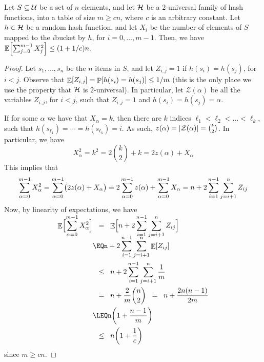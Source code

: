 \begin{lemma}
    Let $S \subseteq \mathcal{U}$ be a set of $n$ elements, and let $\mathcal{H}$ be a
    $2$-universal family of hash functions, into a table of size
    $m \geq cn$, where $c$ is an arbitrary constant. Let $h \in \mathcal{H}$
    be a random hash function, and let $X_i$ be the number of elements
    of $S$ mapped to the $i$\th bucket by $h$, for $i=0,\ldots, m-1$.
    Then, we have
    \begin{math}
        \mathbb{E} \Bigl[\sum_{j=0}^{m-1} X_j^2 \Bigr] \leq (1+1/c)n.
    \end{math}
\end{lemma}
\begin{proof}
    Let $s_1, \ldots, s_n$ be the $n$ items in $S$, and let
    $Z_{i,j} =1$ if $h(s_i) = h(s_j)$, for $i < j$.  Observe that
    $\Ex{Z_{i,j} } = \Prob{h(s_i) = h(s_j)} \leq 1/m$ (this is the
    only place we use the property that $\mathcal{H}$ is $2$-universal).  In
    particular, let $\mathcal{Z}(\alpha)$ be all the variables
    $Z_{i,j}$, for $i<j$, such that $Z_{i,j}=1$ and
    $h(s_i) = h(s_j) = \alpha$.
    
    If for some $\alpha$ we have that $X_\alpha = k$, then there are
    $k$ indices $\ell_1 < \ell_2 < \ldots < \ell_k$, such that
    $h(s_{\ell_1}) = \cdots = h(s_{\ell_k}) = i$. As such,
    $z(\alpha)=\left| {\mathcal{Z}(\alpha)} \right| = \binom{k}{2}$. In
    particular, we have
    \begin{equation*}
        X_\alpha^2%
        =%
        k^2 %
        =%
        2 \binom{k}{2}  + k%
        =%
        2 z(\alpha) + X_\alpha
    \end{equation*}
    This implies that
    \begin{equation*}
        \sum_{\alpha=0}^{m-1} X_\alpha^2%
        =%
        \sum_{\alpha=0}^{m-1} \pth{\bigl.2 z(\alpha) + X_\alpha}
        =%
        2 \sum_{\alpha=0}^{m-1}  z(\alpha) + \sum_{\alpha=0}^{m-1}  X_\alpha
        =%
        n +  2 \sum_{i=1}^{n-1} 
        \sum_{j=i+1}^n Z_{ij}%
    \end{equation*}
    Now, by linearity of expectations, we have
    \begin{align*}
        \Ex{\smash{\sum_{\alpha=0}^{m-1} X_\alpha^2}\Bigr.}%
        &\EQ%
        \Ex{n +  \smash{2 \sum_{i=1}^{n-1} 
              \sum_{j=i+1}^n Z_{ij} } \Bigr.}%
        \\&
        \EQ%
        n +  2 \sum_{i=1}^{n-1} 
        \sum_{j=i+1}^n\Ex{ Z_{ij} } %
        \\&
        \LEQ %
        n +  2 \sum_{i=1}^{n-1} \sum_{j=i+1}^n\frac{1}{m} %
        \\&%
        \EQ %
        n +  \frac{2}{m} \binom{n}{2}%
        \EQ %
        n  +  \frac{2n(n-1)}{2m}
        \\&
        \LEQ%
        n \pth{1 +  \frac{n-1}{m}}
        \\&
        \LEQ
        n\pth{1  + \frac{1}{c}}
    \end{align*}
    since $m \geq c n$.
\end{proof}


